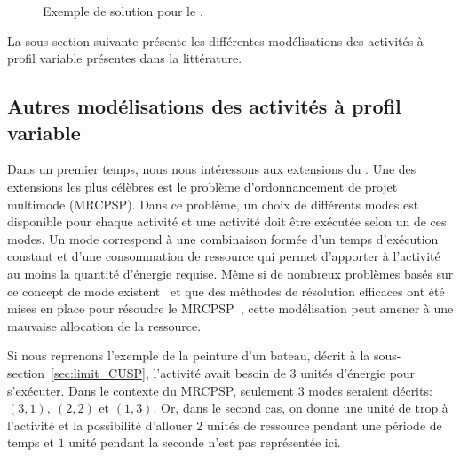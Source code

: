 \begin{ex}
\begin{figure}[!htb]
\centering
{}
\caption{Exemple de solution pour le \CECSP.}
\label{sol_ex_CECSP}
\end{figure}
\end{ex}

La sous-section suivante présente les différentes modélisations des
activités à profil variable présentes dans la
littérature.

\subsection{Autres modélisations des activités à profil variable}

Dans un premier temps, nous nous intéressons aux extensions du
\RCPSP. Une des extensions les plus célèbres est le problème
d'ordonnancement de projet multimode (MRCPSP). Dans ce problème, un
choix de différents modes est disponible pour chaque activité et une
activité doit être exécutée selon un de ces modes. Un mode correspond
à une combinaison formée d'un temps d'exécution constant et d'une
consommation de ressource qui permet d'apporter à l'activité au moins
la quantité d'énergie requise. Même si de nombreux problèmes basés sur
ce concept de mode existent~\cite{DDH,RK,RDK,DD} et que des méthodes
de résolution efficaces ont été mises en place pour résoudre le
MRCPSP~\cite{PV}, cette modélisation peut amener à une mauvaise
allocation de la ressource.

Si nous reprenons l'exemple de la peinture d'un bateau,
décrit à la sous-section~\ref{sec:limit_CUSP}, l'activité avait besoin de
$3$ unités d'énergie pour s'exécuter. Dans le contexte du MRCPSP,
seulement $3$ modes seraient décrits: $(3,1),\ (2,2)$ et $(1,3)$. Or,
dans le second cas, on donne une unité de trop à l'activité et la
possibilité d'allouer $2$ unités de ressource pendant une période de
temps et $1$ unité pendant la seconde n'est pas représentée ici. 

